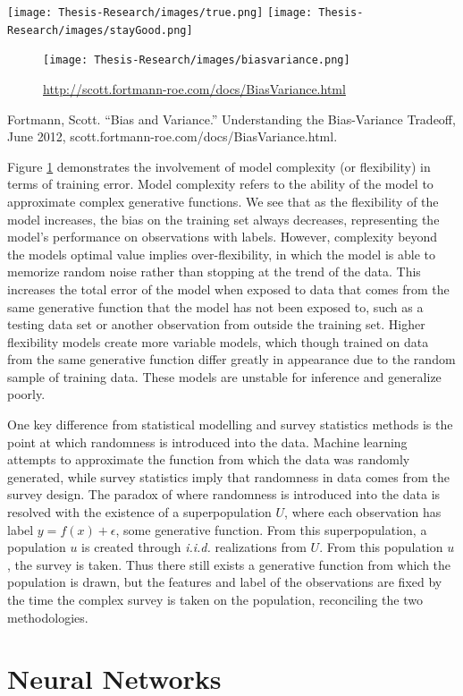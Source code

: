 \documentclass[12pt,twoside]{reedthesis}
\begin{document}
\texttt{[image: Thesis-Research/images/true.png]}
\texttt{[image: Thesis-Research/images/stayGood.png]}
\begin{figure}
\centering
\texttt{[image: Thesis-Research/images/biasvariance.png]}
\caption{\label{fig:biasvar}\url{http://scott.fortmann-roe.com/docs/BiasVariance.html}}
\end{figure}
Fortmann, Scott. ``Bias and Variance.'' Understanding the Bias-Variance
Tradeoff, June 2012, scott.fortmann-roe.com/docs/BiasVariance.html.

Figure \ref{fig:biasvar} demonstrates the involvement of model
complexity (or flexibility) in terms of training error. Model complexity
refers to the ability of the model to approximate complex generative
functions. We see that as the flexibility of the model increases, the
bias on the training set always decreases, representing the model's
performance on observations with labels. However, complexity beyond the
models optimal value implies over-flexibility, in which the model is
able to memorize random noise rather than stopping at the trend of the
data. This increases the total error of the model when exposed to data
that comes from the same generative function that the model has not been
exposed to, such as a testing data set or another observation from
outside the training set. Higher flexibility models create more variable
models, which though trained on data from the same generative function
differ greatly in appearance due to the random sample of training data.
These models are unstable for inference and generalize poorly.

One key difference from statistical modelling and survey statistics
methods is the point at which randomness is introduced into the data.
Machine learning attempts to approximate the function from which the
data was randomly generated, while survey statistics imply that
randomness in data comes from the survey design. The paradox of where
randomness is introduced into the data is resolved with the existence of
a superpopulation \(U\), where each observation has label
\(y = f(x) + \epsilon\), some generative function. From this
superpopulation, a population \(u\) is created through \emph{i.i.d.}
realizations from \(U\). From this population \(u\), the survey is
taken. Thus there still exists a generative function from which the
population is drawn, but the features and label of the observations are
fixed by the time the complex survey is taken on the population,
reconciling the two methodologies.

\section{Neural Networks}\label{neural-networks}
\end{document}
